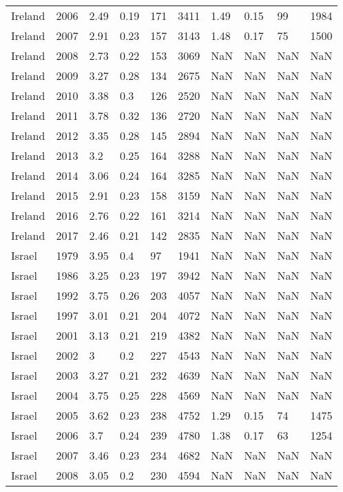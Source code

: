 \begin{tabular}{llllllllll}
Ireland & 2006 & 2.49 & 0.19 & 171 & 3411 & 1.49 & 0.15 & 99 & 1984 \\ 
Ireland & 2007 & 2.91 & 0.23 & 157 & 3143 & 1.48 & 0.17 & 75 & 1500 \\ 
Ireland & 2008 & 2.73 & 0.22 & 153 & 3069 & NaN & NaN & NaN & NaN \\ 
Ireland & 2009 & 3.27 & 0.28 & 134 & 2675 & NaN & NaN & NaN & NaN \\ 
Ireland & 2010 & 3.38 & 0.3 & 126 & 2520 & NaN & NaN & NaN & NaN \\ 
Ireland & 2011 & 3.78 & 0.32 & 136 & 2720 & NaN & NaN & NaN & NaN \\ 
Ireland & 2012 & 3.35 & 0.28 & 145 & 2894 & NaN & NaN & NaN & NaN \\ 
Ireland & 2013 & 3.2 & 0.25 & 164 & 3288 & NaN & NaN & NaN & NaN \\ 
Ireland & 2014 & 3.06 & 0.24 & 164 & 3285 & NaN & NaN & NaN & NaN \\ 
Ireland & 2015 & 2.91 & 0.23 & 158 & 3159 & NaN & NaN & NaN & NaN \\ 
Ireland & 2016 & 2.76 & 0.22 & 161 & 3214 & NaN & NaN & NaN & NaN \\ 
Ireland & 2017 & 2.46 & 0.21 & 142 & 2835 & NaN & NaN & NaN & NaN \\ 
Israel & 1979 & 3.95 & 0.4 & 97 & 1941 & NaN & NaN & NaN & NaN \\ 
Israel & 1986 & 3.25 & 0.23 & 197 & 3942 & NaN & NaN & NaN & NaN \\ 
Israel & 1992 & 3.75 & 0.26 & 203 & 4057 & NaN & NaN & NaN & NaN \\ 
Israel & 1997 & 3.01 & 0.21 & 204 & 4072 & NaN & NaN & NaN & NaN \\ 
Israel & 2001 & 3.13 & 0.21 & 219 & 4382 & NaN & NaN & NaN & NaN \\ 
Israel & 2002 & 3 & 0.2 & 227 & 4543 & NaN & NaN & NaN & NaN \\ 
Israel & 2003 & 3.27 & 0.21 & 232 & 4639 & NaN & NaN & NaN & NaN \\ 
Israel & 2004 & 3.75 & 0.25 & 228 & 4569 & NaN & NaN & NaN & NaN \\ 
Israel & 2005 & 3.62 & 0.23 & 238 & 4752 & 1.29 & 0.15 & 74 & 1475 \\ 
Israel & 2006 & 3.7 & 0.24 & 239 & 4780 & 1.38 & 0.17 & 63 & 1254 \\ 
Israel & 2007 & 3.46 & 0.23 & 234 & 4682 & NaN & NaN & NaN & NaN \\ 
Israel & 2008 & 3.05 & 0.2 & 230 & 4594 & NaN & NaN & NaN & NaN \\ 

\end{tabular}
